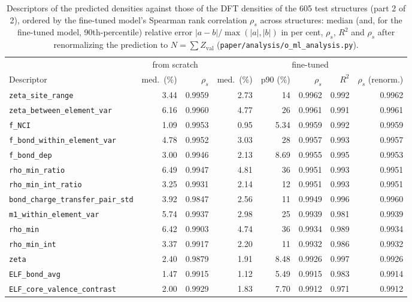 \begin{table}[p]
\centering
\caption{Descriptors of the predicted densities against those of the DFT densities of the 605 test structures (part 2 of 2), ordered by the fine-tuned model's Spearman rank correlation $\rho_s$ across structures: median (and, for the fine-tuned model, 90th-percentile) relative error $|a-b|/\max(|a|,|b|)$ in per cent, $\rho_s$, $R^2$ and $\rho_s$ after renormalizing the prediction to $N=\sum Z_{\mathrm{val}}$ (\texttt{paper/analysis/o\_ml\_analysis.py}).}
\scriptsize
\begin{tabular}{lrrrrrrr}
\toprule
 & \multicolumn{2}{c}{from scratch} & \multicolumn{5}{c}{fine-tuned} \\
Descriptor & med.\ (\%) & $\rho_s$ & med.\ (\%) & p90 (\%) & $\rho_s$ & $R^2$ & $\rho_s$ (renorm.) \\
\midrule
\texttt{zeta\_site\_range} & 3.44 & 0.9959 & 2.73 & 14 & 0.9962 & 0.992 & 0.9962 \\
\texttt{zeta\_between\_element\_var} & 6.16 & 0.9960 & 4.77 & 26 & 0.9961 & 0.991 & 0.9961 \\
\texttt{f\_NCI} & 1.09 & 0.9953 & 0.95 & 5.34 & 0.9959 & 0.992 & 0.9959 \\
\texttt{f\_bond\_within\_element\_var} & 4.78 & 0.9952 & 3.03 & 28 & 0.9957 & 0.993 & 0.9957 \\
\texttt{f\_bond\_dep} & 3.00 & 0.9946 & 2.13 & 8.69 & 0.9955 & 0.995 & 0.9953 \\
\texttt{rho\_min\_ratio} & 6.49 & 0.9947 & 4.81 & 36 & 0.9951 & 0.993 & 0.9951 \\
\texttt{rho\_min\_int\_ratio} & 3.25 & 0.9931 & 2.14 & 12 & 0.9951 & 0.993 & 0.9951 \\
\texttt{bond\_charge\_transfer\_pair\_std} & 3.92 & 0.9847 & 2.56 & 11 & 0.9949 & 0.996 & 0.9960 \\
\texttt{m1\_within\_element\_var} & 5.74 & 0.9937 & 2.98 & 25 & 0.9939 & 0.981 & 0.9939 \\
\texttt{rho\_min} & 6.42 & 0.9903 & 4.74 & 36 & 0.9934 & 0.989 & 0.9934 \\
\texttt{rho\_min\_int} & 3.37 & 0.9917 & 2.20 & 11 & 0.9932 & 0.986 & 0.9932 \\
\texttt{zeta} & 2.40 & 0.9879 & 1.91 & 8.48 & 0.9926 & 0.997 & 0.9926 \\
\texttt{ELF\_bond\_avg} & 1.47 & 0.9915 & 1.12 & 5.49 & 0.9915 & 0.983 & 0.9914 \\
\texttt{ELF\_core\_valence\_contrast} & 2.00 & 0.9929 & 1.83 & 7.70 & 0.9912 & 0.971 & 0.9912 \\

\end{tabular}
\end{table}
